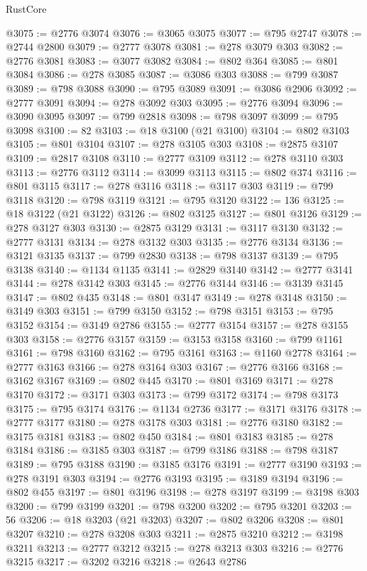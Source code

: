 \begin{lexlean}{RustCore}
\begin{coremodule}
@3075 := @2776 @3074
@3076 := @3065 @3075
@3077 := @795 @2747
@3078 := @2744 @2800
@3079 := @2777 @3078
@3081 := @278 @3079 @303
@3082 := @2776 @3081
@3083 := @3077 @3082
@3084 := @802 @364
@3085 := @801 @3084
@3086 := @278 @3085
@3087 := @3086 @303
@3088 := @799 @3087
@3089 := @798 @3088
@3090 := @795 @3089
@3091 := @3086 @2906
@3092 := @2777 @3091
@3094 := @278 @3092 @303
@3095 := @2776 @3094
@3096 := @3090 @3095
@3097 := @799 @2818
@3098 := @798 @3097
@3099 := @795 @3098
@3100 := 82
@3103 := @18 @3100 (@21 @3100)
@3104 := @802 @3103
@3105 := @801 @3104
@3107 := @278 @3105 @303
@3108 := @2875 @3107
@3109 := @2817 @3108
@3110 := @2777 @3109
@3112 := @278 @3110 @303
@3113 := @2776 @3112
@3114 := @3099 @3113
@3115 := @802 @374
@3116 := @801 @3115
@3117 := @278 @3116
@3118 := @3117 @303
@3119 := @799 @3118
@3120 := @798 @3119
@3121 := @795 @3120
@3122 := 136
@3125 := @18 @3122 (@21 @3122)
@3126 := @802 @3125
@3127 := @801 @3126
@3129 := @278 @3127 @303
@3130 := @2875 @3129
@3131 := @3117 @3130
@3132 := @2777 @3131
@3134 := @278 @3132 @303
@3135 := @2776 @3134
@3136 := @3121 @3135
@3137 := @799 @2830
@3138 := @798 @3137
@3139 := @795 @3138
@3140 := @1134 @1135
@3141 := @2829 @3140
@3142 := @2777 @3141
@3144 := @278 @3142 @303
@3145 := @2776 @3144
@3146 := @3139 @3145
@3147 := @802 @435
@3148 := @801 @3147
@3149 := @278 @3148
@3150 := @3149 @303
@3151 := @799 @3150
@3152 := @798 @3151
@3153 := @795 @3152
@3154 := @3149 @2786
@3155 := @2777 @3154
@3157 := @278 @3155 @303
@3158 := @2776 @3157
@3159 := @3153 @3158
@3160 := @799 @1161
@3161 := @798 @3160
@3162 := @795 @3161
@3163 := @1160 @2778
@3164 := @2777 @3163
@3166 := @278 @3164 @303
@3167 := @2776 @3166
@3168 := @3162 @3167
@3169 := @802 @445
@3170 := @801 @3169
@3171 := @278 @3170
@3172 := @3171 @303
@3173 := @799 @3172
@3174 := @798 @3173
@3175 := @795 @3174
@3176 := @1134 @2736
@3177 := @3171 @3176
@3178 := @2777 @3177
@3180 := @278 @3178 @303
@3181 := @2776 @3180
@3182 := @3175 @3181
@3183 := @802 @450
@3184 := @801 @3183
@3185 := @278 @3184
@3186 := @3185 @303
@3187 := @799 @3186
@3188 := @798 @3187
@3189 := @795 @3188
@3190 := @3185 @3176
@3191 := @2777 @3190
@3193 := @278 @3191 @303
@3194 := @2776 @3193
@3195 := @3189 @3194
@3196 := @802 @455
@3197 := @801 @3196
@3198 := @278 @3197
@3199 := @3198 @303
@3200 := @799 @3199
@3201 := @798 @3200
@3202 := @795 @3201
@3203 := 56
@3206 := @18 @3203 (@21 @3203)
@3207 := @802 @3206
@3208 := @801 @3207
@3210 := @278 @3208 @303
@3211 := @2875 @3210
@3212 := @3198 @3211
@3213 := @2777 @3212
@3215 := @278 @3213 @303
@3216 := @2776 @3215
@3217 := @3202 @3216
@3218 := @2643 @2786

\end{coremodule}
\end{lexlean}
